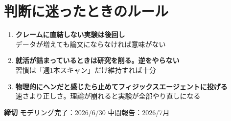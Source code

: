 \documentclass[a4paper, 11pt]{article}
\begin{document}
\vspace{6pt}

\section{判断に迷ったときのルール}

\begin{tcolorbox}[stepbox=navy, title={優先順位の原則}]
  \begin{enumerate}
    \item \textbf{クレームに直結しない実験は後回し}\\
      {\footnotesize\color{mygray} データが増えても論文にならなければ意味がない}
    \item \textbf{就活が詰まっているときは研究を削る。逆をやらない}\\
      {\footnotesize\color{mygray} 習慣は「週1本スキャン」だけ維持すれば十分}
    \item \textbf{物理的にヘンだと感じたら止めてフィジックスエージェントに投げる}\\
      {\footnotesize\color{mygray} 速さより正しさ。理論が崩れると実験が全部やり直しになる}
  \end{enumerate}
\end{tcolorbox}

\vspace{6pt}

\begin{tcolorbox}[graybox]
  \centering
  \textbf{\color{navy}\large 締切}\quad
  モデリング完了：2026/6/30\hspace{2em}
  中間報告：2026/7月
\end{tcolorbox}
\end{document}

